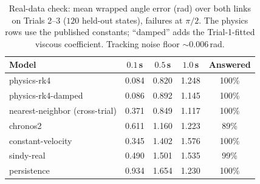 \documentclass{article}
\begin{document}
\begin{table}[tbp]
\centering\small
\caption{Real-data check: mean wrapped angle error (rad) over both links on Trials 2--3
($120$ held-out states), failures at $\pi/2$. The physics rows use the published constants;
``damped'' adds the Trial-1-fitted viscous coefficient. Tracking noise floor
${\sim}0.006$\,rad.}
\label{tab:realdata}
\begin{tabular}{lcccc}
\toprule
Model & $0.1$\,s & $0.5$\,s & $1.0$\,s & Answered \\
\midrule
physics-rk4 & 0.084 & 0.820 & 1.248 & 100\% \\
physics-rk4-damped & 0.086 & 0.892 & 1.145 & 100\% \\
nearest-neighbor (cross-trial) & 0.371 & 0.849 & 1.117 & 100\% \\
chronos2 & 0.611 & 1.160 & 1.223 & 89\% \\
constant-velocity & 0.345 & 1.402 & 1.576 & 100\% \\
sindy-real & 0.490 & 1.501 & 1.535 & 99\% \\
persistence & 0.934 & 1.654 & 1.230 & 100\% \\
\bottomrule
\end{tabular}
\end{table}
\end{document}
